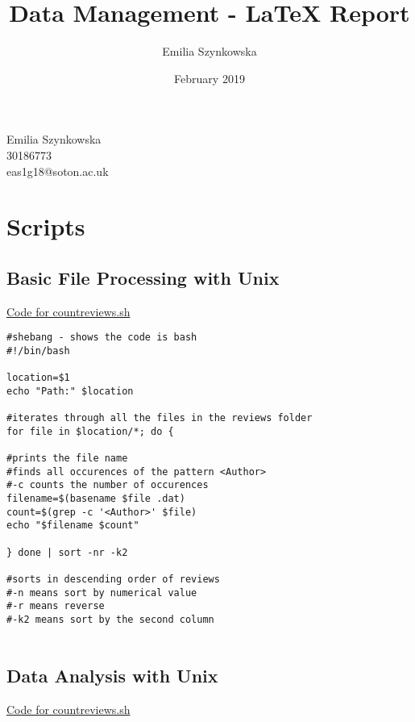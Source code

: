 \documentclass[12pt]{article}
\title{\huge{Data Management - \LaTeX{} Report}}
\date{\large{February 2019}}
\author{Emilia Szynkowska}
\begin{document}
\maketitle
\begin{center}
\LARGE{Emilia Szynkowska\\30186773\\eas1g18@soton.ac.uk}
\end{center}

\newpage

\section{Scripts}

\subsection{Basic File Processing with Unix}

\underline{Code for countreviews.sh} \\

\begin{lstlisting}
#shebang - shows the code is bash
#!/bin/bash

location=$1
echo "Path:" $location

#iterates through all the files in the reviews folder
for file in $location/*; do {

#prints the file name
#finds all occurences of the pattern <Author>
#-c counts the number of occurences
filename=$(basename $file .dat)
count=$(grep -c '<Author>' $file)
echo "$filename $count"

} done | sort -nr -k2 

#sorts in descending order of reviews
#-n means sort by numerical value
#-r means reverse
#-k2 means sort by the second column


\end{lstlisting}

\newpage
\subsection{Data Analysis with Unix}

\underline{Code for countreviews.sh} \\
\end{document}
